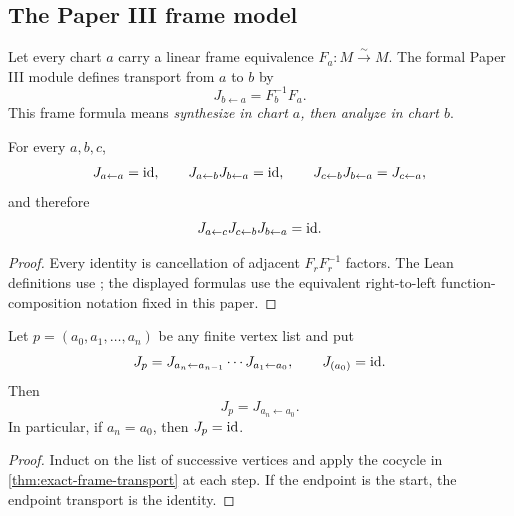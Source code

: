 \subsection{The Paper III frame model}

Let every chart $a$ carry a linear frame equivalence
$F_a:M\xrightarrow{\sim}M$.  The formal Paper III module defines transport
from $a$ to $b$ by
\[
J_{b\leftarrow a}=F_b^{-1}F_a.
\]
This frame formula means \emph{synthesize in chart \(a\), then
analyze in chart \(b\)}.

\begin{theorem}
\label{thm:exact-frame-transport}
For every $a,b,c$,
\[
J_{a\leftarrow a}=\mathrm{id},\qquad
J_{a\leftarrow b}J_{b\leftarrow a}=\mathrm{id},\qquad
J_{c\leftarrow b}J_{b\leftarrow a}=J_{c\leftarrow a},
\]
and therefore
\[
J_{a\leftarrow c}J_{c\leftarrow b}J_{b\leftarrow a}=\mathrm{id}.
\]
\end{theorem}

\begin{proof}
Every identity is cancellation of adjacent $F_rF_r^{-1}$ factors.  The Lean
definitions use ; the displayed formulas use the
equivalent right-to-left function-composition notation fixed in this paper.
\end{proof}

\begin{theorem}
\label{thm:exact-path-transport}
Let $p=(a_0,a_1,\ldots,a_n)$ be any finite vertex list and put
\[
J_p
=J_{a_n\leftarrow a_{n-1}}\cdots J_{a_1\leftarrow a_0},
\qquad
J_{(a_0)}=\mathrm{id}.
\]
Then
\[
J_p=J_{a_n\leftarrow a_0}.
\]
In particular, if $a_n=a_0$, then $J_p=\mathrm{id}$.
\end{theorem}

\begin{proof}
Induct on the list of successive vertices and apply the cocycle in
\cref{thm:exact-frame-transport} at each step.  If the endpoint is the start,
the endpoint transport is the identity.
\end{proof}

